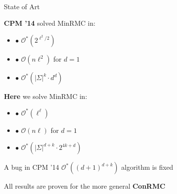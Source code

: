 \documentclass{beamer}
\renewcommand{\l}{\left}
\renewcommand{\r}{\right}
\begin{document}
\begin{frame}{State of Art}
\begin{minipage}{.45 \textwidth}
  \begin{center}
    \textbf{CPM '14} solved MinRMC in:
  \end{center}
  \begin{itemize}
  \item $\bullet$ $\mathcal{O}^*\l(2^{\ell^2 / 2}\r)$
  \item $\bullet$ $\mathcal{O}\l(n \ell^2\r)$ for $d = 1$
  \item $\bullet$ $\mathcal{O}^*\l(|\Sigma|^k \cdot
    d^d\r)$
  \end{itemize}
\end{minipage}
\hfill
\begin{minipage}{.45 \textwidth}
  \begin{center}
    \textbf{Here} we solve MinRMC in:
  \end{center}\begin{itemize}
  \item $\bullet$ $\mathcal{O}^*\l(\ell^\ell\r)$
  \item $\bullet$ $\mathcal{O}\l(n \ell\r)$ for $d = 1$
  \item $\bullet$ $\mathcal{O}^*\l(|\Sigma|^{d+ k} \cdot 2^{4k + d}\r)$
  \end{itemize}
\end{minipage}
\pause
\vspace{2em}
\begin{center}
  A bug in CPM '14 $\mathcal{O}^*\l((d + 1)^{d + k}\r)$ algorithm is fixed 
\end{center}
\begin{center}
  All results are proven for the more general \textbf{ConRMC}
\end{center}

\end{frame}
\end{document}
